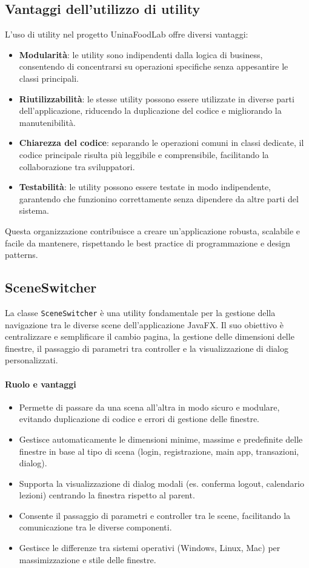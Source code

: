 \subsection{Vantaggi dell'utilizzo di utility}
L'uso di utility nel progetto UninaFoodLab offre diversi vantaggi:
\begin{itemize}
    \item \textbf{Modularità}: le utility sono indipendenti dalla logica di business, consentendo di concentrarsi su operazioni specifiche senza appesantire le classi principali.
    \item \textbf{Riutilizzabilità}: le stesse utility possono essere utilizzate in diverse parti dell'applicazione, riducendo la duplicazione del codice e migliorando la manutenibilità.
    \item \textbf{Chiarezza del codice}: separando le operazioni comuni in classi dedicate, il codice principale risulta più leggibile e comprensibile, facilitando la collaborazione tra sviluppatori.
    \item \textbf{Testabilità}: le utility possono essere testate in modo indipendente, garantendo che funzionino correttamente senza dipendere da altre parti del sistema.
\end{itemize}
Questa organizzazione contribuisce a creare un'applicazione robusta, scalabile e facile da mantenere, rispettando le best practice di programmazione e design patterns.

\subsection{SceneSwitcher}
La classe \texttt{SceneSwitcher} è una utility fondamentale per la gestione della navigazione tra le diverse scene dell'applicazione JavaFX. Il suo obiettivo è centralizzare e semplificare il cambio pagina, la gestione delle dimensioni delle finestre, il passaggio di parametri tra controller e la visualizzazione di dialog personalizzati.

\paragraph{Ruolo e vantaggi}
\begin{itemize}
    \item Permette di passare da una scena all'altra in modo sicuro e modulare, evitando duplicazione di codice e errori di gestione delle finestre.
    \item Gestisce automaticamente le dimensioni minime, massime e predefinite delle finestre in base al tipo di scena (login, registrazione, main app, transazioni, dialog).
    \item Supporta la visualizzazione di dialog modali (es. conferma logout, calendario lezioni) centrando la finestra rispetto al parent.
    \item Consente il passaggio di parametri e controller tra le scene, facilitando la comunicazione tra le diverse componenti.
    \item Gestisce le differenze tra sistemi operativi (Windows, Linux, Mac) per massimizzazione e stile delle finestre.
\end{itemize}

